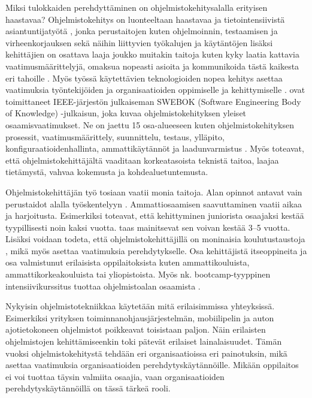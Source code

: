 \documentclass[utf8]{gradu3}
\begin{document}
Miksi tulokkaiden perehdyttäminen on ohjelmistokehitysalalla erityisen haastavaa? Ohjelmistokehitys on luonteeltaan haastavaa ja tietointensiivistä asiantuntijatyötä \parencite{viana-ym-2014}, jonka perustaitojen kuten ohjelmoinnin, testaamisen ja virheenkorjauksen sekä näihin liittyvien työkalujen ja käytäntöjen lisäksi kehittäjien on osattava laaja joukko muitakin taitoja kuten kyky laatia kattavia vaatimusmäärittelyjä, omaksua nopeasti asioita ja kommunikoida tästä kaikesta eri tahoille %
\parencites%
    {tejera-hernández-ym-2018}%
    {begel-simon-2008-all-over-again}%
\relax.
%
Myös työssä käytettävien teknologioiden nopea kehitys asettaa vaatimuksia työntekijöiden ja organisaatioiden oppimiselle ja kehittymiselle \parencite{tejera-hernández-ym-2018}. \textcite{swebok} ovat toimittaneet IEEE-järjestön julkaiseman SWEBOK (Software Engineering Body of Knowledge) -julkaisun, joka kuvaa ohjelmistokehityksen yleiset osaamisvaatimukset. Ne on jaettu 15 osa-alueeseen kuten ohjelmistokehityksen prosessit, vaatimusmäärittely, suunnittelu, testaus, ylläpito, konfiguraatioidenhallinta, ammattikäytännöt ja laadunvarmistus \parencite{swebok}. Myös \textcite{gregory-ym-2020} toteavat, että ohjelmistokehittäjältä vaaditaan korkeatasoista teknistä taitoa, laajaa tietämystä, vahvaa kokemusta ja kohdealuetuntemusta. 

Ohjelmistokehittäjän työ tosiaan vaatii monia taitoja. Alan opinnot antavat vain perustaidot alalla työskentelyyn \parencite{begel-simon-2008-all-over-again}. Ammattiosaamisen saavuttaminen vaatii aikaa ja harjoitusta. Esimerkiksi \textcite{bologa-lupu-2014} toteavat, että kehittyminen juniorista osaajaksi kestää tyypillisesti noin kaksi vuotta. \textcite{britto-ym-2020} taas mainitsevat sen voivan kestää 3--5 vuotta. Lisäksi voidaan todeta, että ohjelmistokehittäjillä on moninaisia koulutustaustoja \parencite{barnes-ym-2022}, mikä myös asettaa vaatimuksia perehdytykselle. Osa kehittäjistä itseoppineita ja osa valmistunut erilaisista oppilaitoksista kuten ammattikouluista, ammattikorkeakouluista tai yliopistoista. Myös nk. bootcamp-tyyppinen intensiivikurssitus tuottaa ohjelmistoalan osaamista \parencite{lyon-green-2021}.

Nykyisin ohjelmistotekniikkaa käytetään mitä erilaisimmissa yhteyksissä. Esimerkiksi yrityksen toiminnanohjausjärjestelmän, mobiilipelin ja auton ajotietokoneen ohjelmistot poikkeavat toisistaan paljon. Näin erilaisten ohjelmistojen kehittämiseenkin toki pätevät erilaiset lainalaisuudet. Tämän vuoksi ohjelmistokehitystä tehdään eri organisaatioissa eri painotuksin, mikä asettaa vaatimuksia organisaatioiden perehdytyskäytännöille. Mikään oppilaitos ei voi tuottaa täysin valmiita osaajia, vaan organisaatioiden perehdytyskäytännöillä on tässä tärkeä rooli.
\end{document}
